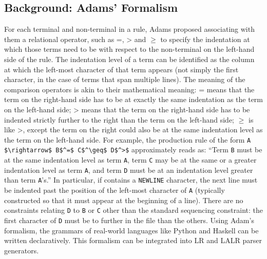 \subsection{Background: Adams' Formalism}
For each terminal and non-terminal in a rule, Adams proposed associating with them a relational operator, such as =, > and $\geq$ to specify the indentation at which those terms need to be with respect to the non-terminal on the left-hand side of the rule. The indentation level of a term can be identified as the column at which the left-most character of that term appears (not simply the first character, in the case of terms that span multiple lines). The meaning of the comparison operators is akin to their mathematical meaning: = means that the term on the right-hand side has to be at exactly the same indentation as the term on the left-hand side; >  means that the term on the right-hand side has to be indented strictly further to the right than the term on the left-hand side; $\geq$ is like >, except the term on the right could also be at the same indentation level as the term on the left-hand side. For example, the production rule of the form \lstinline{A $\rightarrow$ B$^=$ C$^\geq$ D$^>$} approximately reads as: ``Term \lstinline{B} must be at the same indentation level as term \lstinline{A}, term \lstinline{C} may be at the same or a greater indentation level as term \lstinline{A}, and term \lstinline{D} must be at an indentation level greater than term \lstinline{A}'s.'' In particular, if  contains a \lstinline{NEWLINE} character, the next line must be indented past the position of the left-most character of \lstinline{A} (typically constructed so that it must appear at the beginning of a line). There are no constraints relating \lstinline{D} to \lstinline{B} or \lstinline{C} other than the standard sequencing constraint: the first character of \lstinline{D} must be to further in the file than the others. Using Adam's formalism, the grammars of real-world languages like Python and Haskell can be written declaratively. This formalism can be integrated into LR and LALR parser generators.


